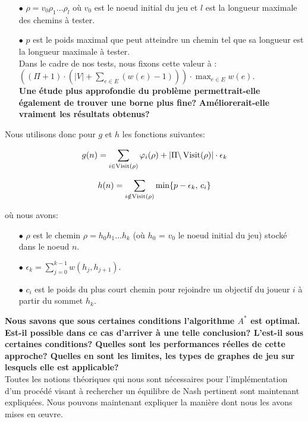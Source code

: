\begin{itemize}
	\item[$\bullet$] $\rho = v_0 \rho_1 ... \rho_l$ où $v_0$ est le noeud initial du jeu et $l$ est la longueur maximale des chemins à tester.
	\item[$\bullet$] $p$ est le poids maximal que peut atteindre un chemin tel que sa longueur est la longueur maximale à tester.\\
	 Dans le cadre de nos tests, nous fixons cette valeur à :\linebreak $((\Pi + 1) \cdot (|V| + \sum_{e \in E} (w(e) - 1)))\cdot \max_{e \in E} w(e)$.\\ \textbf{Une étude plus approfondie du problème permettrait-elle \linebreak également de trouver une borne plus fine?} \textbf{Améliorerait-elle vraiment les résultats obtenus?}\\
\end{itemize}

Nous utilisons donc pour $g$ et $h$ les fonctions suivantes:

$$ g(n) = \sum_{i \in \operatorname*{Visit}(\rho)} \varphi_i(\rho) + |\Pi\backslash \operatorname*{Visit}(\rho)| \cdot \epsilon_k$$



$$h(n) = \sum_{i \notin \operatorname*{Visit}(\rho)} \min\{ p - \epsilon_k ,\, c_i \}$$


où nous avons:

\begin{itemize}
	\item[$\bullet$] $\rho$ est le chemin $\rho = h_0 h_1 ... h_k$ (où $h_0$ = $v_0$ le noeud initial du jeu) stocké dans le noeud $n$.
	\item[$\bullet$] $\displaystyle \epsilon_k = \sum_{j = 0}^{k-1} w(h_j, h_{j+1})$.
	\item[$\bullet$] $c_i$ est le poids du plus court chemin pour rejoindre un objectif du joueur $i$ à partir du sommet $h_k$.
\end{itemize}
$ $\\
\textbf{Nous savons que sous certaines conditions l'algorithme $A^*$ est optimal. Est-il possible dans ce cas d'arriver à une telle conclusion? L'est-il sous certaines conditions? Quelles sont les performances réelles de cette approche? Quelles en sont les limites, les types de graphes de jeu sur lesquels elle est applicable?}\\
	
	
	
Toutes les notions théoriques qui nous sont nécessaires pour l'implémentation d'un procédé visant à rechercher un équilibre de Nash pertinent sont maintenant expliquées. Nous pouvons maintenant expliquer la manière dont nous les avons mises en \oe uvre.











